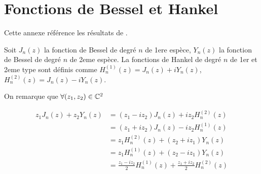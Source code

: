 \section{Fonctions de Bessel et Hankel}

Cette annexe référence les résultats de \cite{abramowitz_handbook_1964}.

Soit $J_n(z)$ la fonction de Bessel de degré $n$ de 1ere espèce, $Y_n(z)$ la fonction de Bessel de degré $n$ de 2eme espèce.
La fonctions de Hankel de degré $n$ de 1er et 2eme type sont définis comme $H_n^{(1)}(z) = J_n(z) + iY_n(z)$, $H_n^{(2)}(z) = J_n(z) - iY_n(z)$.

On remarque que $\forall (z_1,z_2) \in \mathbb C^2$

\begin{equation}
\begin{aligned}
z_1 J_n(z) + z_2 Y_n(z) 
&= ( z_1 - i z_2 ) J_n(z) + iz_2 H_n^{(2)}(z) \\
&= ( z_1 + i z_2 ) J_n(z) - iz_2 H_n^{(1)}(z) \\
&= z_1 H_n^{(2)}(z) + ( z_2 + i z_1 ) Y_n(z) \\
&= z_1 H_n^{(1)}(z) + ( z_2 - i z_1 ) Y_n(z) \\
&= \frac{z_1-iz_2}{2}H_n^{(1)}(z) + \frac{z_1+iz_2}{2}H_n^{(2)}(z)
\end{aligned}
\label{eq:annex:bessel:equiv_bessel}
\end{equation}